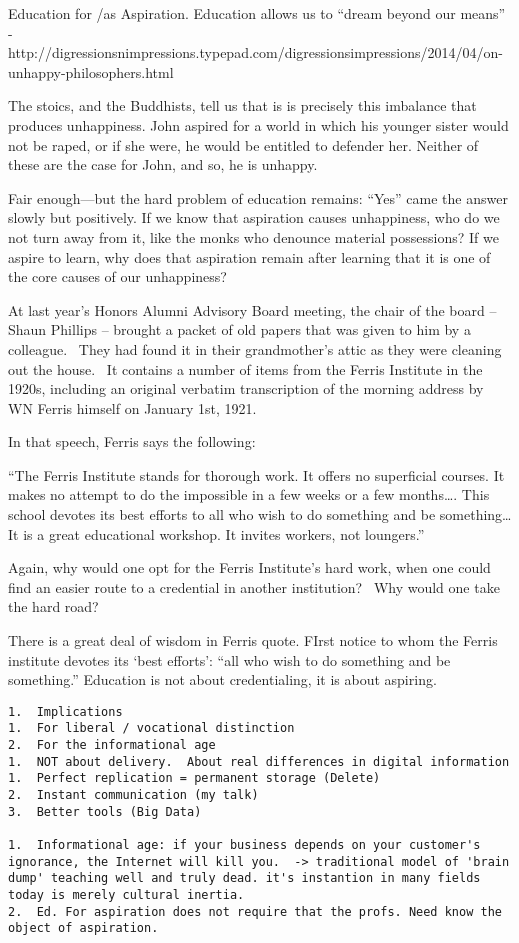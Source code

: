 Education for \slash  as Aspiration. Education allows us to ``dream beyond our means'' - http:\slash \slash digressionsnimpressions.typepad.com\slash digressionsimpressions\slash 2014\slash 04\slash on-unhappy-philosophers.html

The stoics, and the Buddhists, tell us that is is precisely this imbalance that produces unhappiness. John aspired for a world in which his younger sister would not be raped, or if she were, he would be entitled to defender her. Neither of these are the case for John, and so, he is unhappy.

Fair enough---but the hard problem of education remains: ``Yes'' came the answer slowly but positively. If we know that aspiration causes unhappiness, who do we not turn away from it, like the monks who denounce material possessions? If we aspire to learn, why does that aspiration remain after learning that it is one of the core causes of our unhappiness? 

At last year's Honors Alumni Advisory Board meeting, the chair of the board -- Shaun Phillips -- brought a packet of old papers that was given to him by a colleague.  They had found it in their grandmother's attic as they were cleaning out the house.  It contains a number of items from the Ferris Institute in the 1920s, including an original verbatim transcription of the morning address by WN Ferris himself on January 1st, 1921.

In that speech, Ferris says the following:

``The Ferris Institute stands for thorough work. It offers no superficial courses. It makes no attempt to do the impossible in a few weeks or a few months{\ldots}. This school devotes its best efforts to all who wish to do something and be something{\ldots} It is a great educational workshop. It invites workers, not loungers.''

Again, why would one opt for the Ferris Institute's hard work, when one could find an easier route to a credential in another institution?  Why would one take the hard road?

There is a great deal of wisdom in Ferris quote. FIrst notice to whom the Ferris institute devotes its `best efforts': ``all who wish to do something and be something.'' Education is not about credentialing, it is about aspiring. 

\begin{verbatim}
1.  Implications
1.  For liberal / vocational distinction
2.  For the informational age
1.  NOT about delivery.  About real differences in digital information
1.  Perfect replication = permanent storage (Delete)
2.  Instant communication (my talk)
3.  Better tools (Big Data)

1.  Informational age: if your business depends on your customer's ignorance, the Internet will kill you.  -> traditional model of 'brain dump' teaching well and truly dead. it's instantion in many fields today is merely cultural inertia.
2.  Ed. For aspiration does not require that the profs. Need know the object of aspiration.
\end{verbatim}

